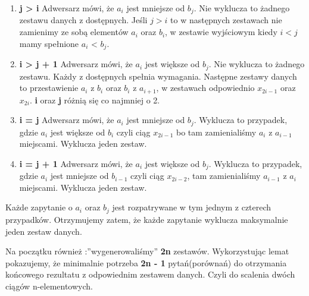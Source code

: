 \documentclass[a4paper,12pt]{article}
\begin{document}
\begin{enumerate}
  \item \textbf{j > i} Adwersarz mówi, że $a_i$ jest mniejsze od $b_j$. Nie wyklucza to żadnego zestawu danych z dostępnych. Jeśli $j > i$ to w następnych zestawach nie zamienimy ze sobą elementów $a_i$ oraz $b_i$, w zestawie wyjściowym kiedy $i < j$ mamy spełnione $a_i$ < $b_j$. \newpage
  \item \textbf{i > j + 1} Adwersarz mówi, że $a_i$ jest większe od $b_j$. Nie wyklucza to żadnego zestawu. Każdy z dostępnych spełnia wymagania. Następne zestawy danych to przestawienie $a_i$ z $b_i$ oraz  $b_i$ z $a_{i+1}$, w zestawach odpowiednio  $x_{2i-1}$ oraz  $x_{2i}$. \textbf{i} oraz \textbf{j} różnią się co najmniej o 2.
  \item \textbf{i = j} Adwersarz mówi, że $a_i$ jest mniejsze od $b_j$. Wyklucza to przypadek, gdzie $a_i$ jest większe od $b_i$ czyli ciąg $x_{2i-1}$
   bo tam zamienialiśmy $a_i$ z $a_{i-1}$ miejscami. Wyklucza jeden zestaw.
  \item \textbf{i = j + 1} Adwersarz mówi, że $a_i$ jest większe od $b_j$.  Wyklucza to przypadek, gdzie $a_i$ jest mniejsze od $b_{i-1}$ czyli ciąg $x_{2i-2}$, tam zamienialiśmy 
  $a_{i-1}$ z $a_{i}$ miejscami. Wyklucza jeden zestaw.
\end{enumerate}
Każde zapytanie o $a_i$ oraz $b_j$ jest rozpatrywane w tym jednym z czterech przypadków. Otrzymujemy zatem, że każde zapytanie wyklucza maksymalnie jeden zestaw danych.
\begin{flushright}
\qedsymbol 
\end{flushright}
Na początku również :''wygenerowaliśmy'' \textbf{2n} zestawów. Wykorzystując lemat pokazujemy, że minimalnie potrzeba \textbf{2n - 1} pytań(porównań) do otrzymania końcowego rezultatu z odpowiednim zestawem danych. Czyli do scalenia dwóch ciągów n-elementowych.
\end{document}
